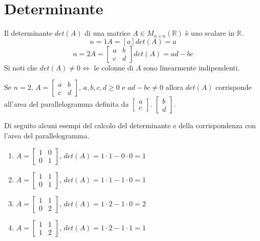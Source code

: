 \newpage
\section{Determinante}

\begin{definition}[Determinante]
	Il determinante $det(A)$ di una matrice $A \in M_{n \times n}(\mathbb{R})$ è uno scalare in $\mathbb{R}$.
	\begin{equation*}
		n=1 A=[a] det(A)=a
	\end{equation*}
	\begin{equation*}
		n=2 A=\begin{bmatrix}
			a & b\\
			c & d
		\end{bmatrix}
		det(A) = ad - bc
	\end{equation*}
	Si noti che $det(A)\neq0 \Longleftrightarrow$ le colonne di $A$ sono linearmente indipendenti.
\end{definition}
\begin{theorem}
	Se $n=2$, $A=\begin{bmatrix}
		a & b \\ c & d
	\end{bmatrix}$, $a,b,c,d \geq 0$ e $ad - bc \neq 0$ allora $det(A)$ corrisponde all'area del parallelogramma definita da $\begin{bmatrix}
		a \\ c
	\end{bmatrix}$. $\begin{bmatrix}
		b \\ d
	\end{bmatrix}$.
	\begin{example}
		Di seguito alcuni esempi del calcolo del determinante e della corrispondenza con l'area del parallelogramma.
		\begin{enumerate}
			\item $A=\begin{bmatrix}
				1 & 0 \\ 0 & 1
			\end{bmatrix}$, $det(A)=1 \cdot 1 - 0 \cdot 0 = 1$
			\item $A=\begin{bmatrix}
				1 & 1 \\ 0 & 1
			\end{bmatrix}$, $det(A)=1 \cdot 1 - 1 \cdot 0 = 1$
			\item $A=\begin{bmatrix}
				1 & 1 \\ 0 & 2
			\end{bmatrix}$, $det(A)=1 \cdot 2 - 1 \cdot 0 = 2$
			\item $A=\begin{bmatrix}
				1 & 1 \\ 1 & 2
			\end{bmatrix}$, $det(A)=1 \cdot 2 - 1 \cdot 1 = 1$
		\end{enumerate}
	\end{example}
\end{theorem}

